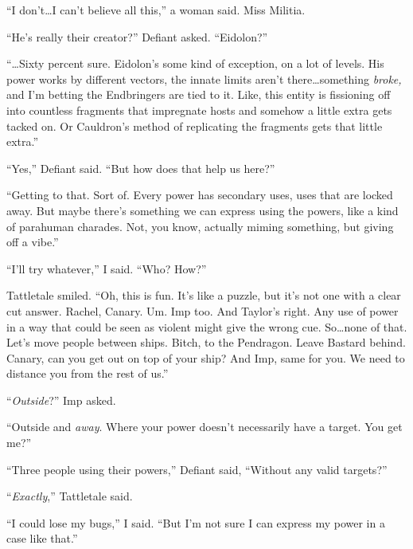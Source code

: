 ``I don't\ldots I can't believe all this,'' a woman said.  Miss Militia.



``He's really their creator?''  Defiant asked.  ``Eidolon?''



``\ldots{}Sixty percent sure.  Eidolon's some kind of exception, on a lot of levels.  His power works by different vectors, the innate limits aren't there\ldots something \emph{broke, }and I'm betting the Endbringers are tied to it.  Like, this entity is fissioning off into countless fragments that impregnate hosts and somehow a little extra gets tacked on.  Or Cauldron's method of replicating the fragments gets that little extra.''



``Yes,'' Defiant said.  ``But how does that help us here?''



``Getting to that.  Sort of.  Every power has secondary uses, uses that are locked away.  But maybe there's something we can express using the powers, like a kind of parahuman charades.  Not, you know, actually miming something, but giving off a vibe.''



``I'll try whatever,'' I said.  ``Who?  How?''



Tattletale smiled.  ``Oh, this is fun.  It's like a puzzle, but it's not one with a clear cut answer.  Rachel, Canary.  Um.  Imp too.  And Taylor's right.  Any use of power in a way that could be seen as violent might give the wrong cue.  So\ldots none of that.  Let's move people between ships.  Bitch, to the Pendragon.  Leave Bastard behind.  Canary, can you get out on top of your ship?  And Imp, same for you.  We need to distance you from the rest of us.''



``\emph{Outside}?'' Imp asked.



``Outside and \emph{away}.  Where your power doesn't necessarily have a target.  You get me?''



``Three people using their powers,'' Defiant said, ``Without any valid targets?''



``\emph{Exactly},'' Tattletale said.



``I could lose my bugs,'' I said.  ``But I'm not sure I can express my power in a case like that.''



